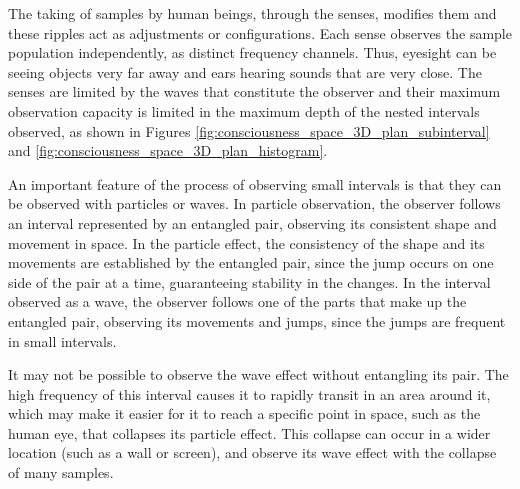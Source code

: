The taking of samples by human beings, through the senses, modifies them and these ripples act as adjustments or configurations. Each sense observes the sample population independently, as distinct frequency channels. Thus, eyesight can be seeing objects very far away and ears hearing sounds that are very close. The senses are limited by the waves that constitute the observer and their maximum observation capacity is limited in the maximum depth of the nested intervals observed, as shown in Figures \ref{fig:consciousness_space_3D_plan_subinterval} and \ref{fig:consciousness_space_3D_plan_histogram}.

An important feature of the process of observing small intervals is that they can be observed with particles or waves. In particle observation, the observer follows an interval represented by an entangled pair, observing its consistent shape and movement in space. In the particle effect, the consistency of the shape and its movements are established by the entangled pair, since the jump occurs on one side of the pair at a time, guaranteeing stability in the changes. In the interval observed as a wave, the observer follows one of the parts that make up the entangled pair, observing its movements and jumps, since the jumps are frequent in small intervals.

It may not be possible to observe the wave effect without entangling its pair. The high frequency of this interval causes it to rapidly transit in an area around it, which may make it easier for it to reach a specific point in space, such as the human eye, that collapses its particle effect. This collapse can occur in a wider location (such as a wall or screen), and observe its wave effect with the collapse of many samples.
